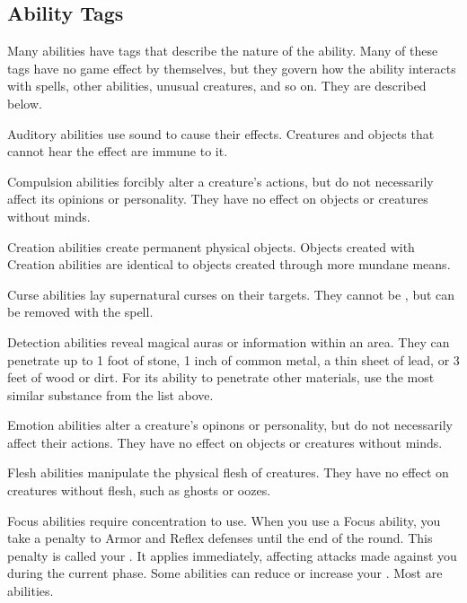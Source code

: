     \subsection{Ability Tags}\label{Ability Tags}

        Many abilities have tags that describe the nature of the ability.
        Many of these tags have no game effect by themselves, but they govern how the ability interacts with spells, other abilities, unusual creatures, and so on.
        They are described below.

         Auditory abilities use sound to cause their effects.
        Creatures and objects that cannot hear the effect are immune to it.

         Compulsion abilities forcibly alter a creature's actions, but do not necessarily affect its opinions or personality.
        They have no effect on objects or creatures without minds.

         Creation abilities create permanent physical objects.
        Objects created with Creation abilities are identical to objects created through more mundane means.

         Curse abilities lay supernatural curses on their targets.
        They cannot be , but can be removed with the  spell.

        \label{Detection} Detection abilities reveal magical auras or information within an area.
        They can penetrate up to 1 foot of stone, 1 inch of common metal, a thin sheet of lead, or 3 feet of wood or dirt.
        For its ability to penetrate other materials, use the most similar substance from the list above.

         Emotion abilities alter a creature's opinons or personality, but do not necessarily affect their actions.
        They have no effect on objects or creatures without minds.

         Flesh abilities manipulate the physical flesh of creatures.
        They have no effect on creatures without flesh, such as ghosts or oozes.

        \label{Focus} Focus abilities require concentration to use.
        When you use a Focus ability, you take a  penalty to Armor and Reflex defenses until the end of the round.
        This penalty is called your .
        It applies immediately, affecting attacks made against you during the current phase.
        Some abilities can reduce or increase your .
        Most  are  abilities.

